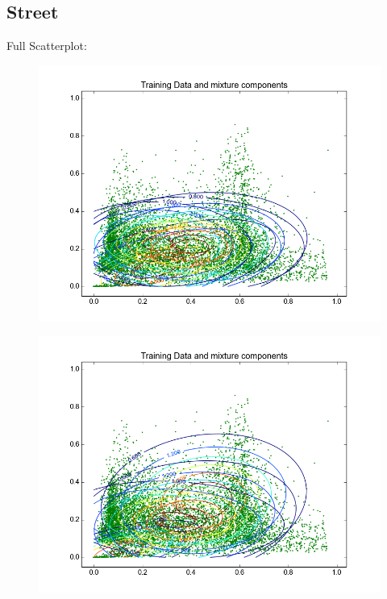 \documentclass[11pt,a4paper]{article}
\begin{document}
\subsection{Street}
Full Scatterplot: \\
\begin{minipage}[b]{0.25\textwidth}
\begin{figure}[H]
  \centering
  \includegraphics[width=.8\linewidth]{Figures/contoursstreet0.png}
  \label{fig:sfig1}
\end{figure}%
\end{minipage}
\begin{minipage}[b]{0.25\textwidth}
\begin{figure}[H]
  \centering
  \includegraphics[width=.8\linewidth]{Figures/contoursstreet5.png}

  \label{fig:sfig1}
\end{figure}%
\end{minipage}
\end{document}
